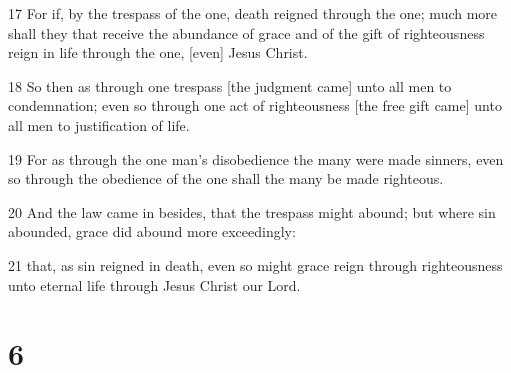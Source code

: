 \par 17 For if, by the trespass of the one, death reigned through the one; much more shall they that receive the abundance of grace and of the gift of righteousness reign in life through the one, [even] Jesus Christ.
\par 18 So then as through one trespass [the judgment came] unto all men to condemnation; even so through one act of righteousness [the free gift came] unto all men to justification of life.
\par 19 For as through the one man's disobedience the many were made sinners, even so through the obedience of the one shall the many be made righteous.
\par 20 And the law came in besides, that the trespass might abound; but where sin abounded, grace did abound more exceedingly:
\par 21 that, as sin reigned in death, even so might grace reign through righteousness unto eternal life through Jesus Christ our Lord.

\chapter{6}

